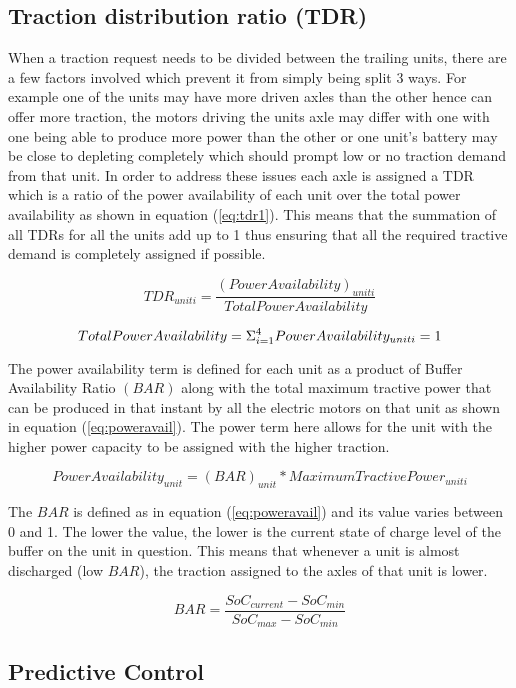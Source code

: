 \documentclass[MastersThesis.tex]{subfiles}
\begin{document}
\subsection{Traction distribution ratio (TDR)} \label{sec:tdr}
When a traction request needs to be divided between the trailing units, there are a few factors involved which prevent it from simply being split 3 ways. For example one of the units may have more driven axles than the other hence can offer more traction, the motors driving the units axle may differ with one with one being able to produce more power than the other or one unit’s battery may be close to depleting completely which should prompt low or no traction demand from that unit. In order to address these issues each axle is assigned a TDR which is a ratio of the power availability of each unit over the total power availability as shown in equation (\ref{eq:tdr1}). This means that the summation of all TDRs for all the units add up to 1 thus ensuring that all the required tractive demand is completely assigned if possible. 

\begin{equation} \label{eq:tdr1}
TDR_{unit i}=\frac{(Power Availability)_{unit i}}{Total Power Availability}
\end{equation}
 
\begin{equation} \label{eq:tdr2}
Total Power Availability = \Sigma_{i=1}^{4} Power Availability_{unit i} = 1\\
\end{equation}

The power availability term is defined for each unit as a product of Buffer Availability Ratio $(BAR)$ along with the total maximum tractive power that can be produced in that instant by all the electric motors on that unit as shown in equation (\ref{eq:poweravail}). The power term here allows for the unit with the higher power capacity to be assigned with the higher traction.

\begin{equation} \label{eq:poweravail}
Power Availability_{unit} = (BAR)_{unit} * Maximum Tractive Power_{unit i}
\end{equation}
   
The $BAR$ is defined as in equation (\ref{eq:poweravail}) and its value varies between 0 and 1. The lower the value, the lower is the current state of charge level of the buffer on the unit in question. This means that whenever a unit is almost discharged (low $BAR$), the traction assigned to the axles of that unit is lower. 

\begin{equation} \label{eq:bar}
BAR = \frac{SoC_{current}-SoC_{min}}{SoC_{max}-SoC_{min}}
\end{equation}

\subsection{Predictive Control} \label{sec:predcontrol}
\end{document}
